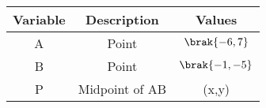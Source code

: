 \begin{tabular}[12pt]{ |c|c|c|}
    \hline
    \textbf{Variable} & \textbf{Description} & \textbf{Values}\\ 
    \hline
    A & Point & $\brak{-6,7}$\\
    \hline
    B & Point & $\brak{-1,-5}$ \\
    \hline
    P &  Midpoint of AB & (x,y) \\

    \hline   
    \end{tabular}

